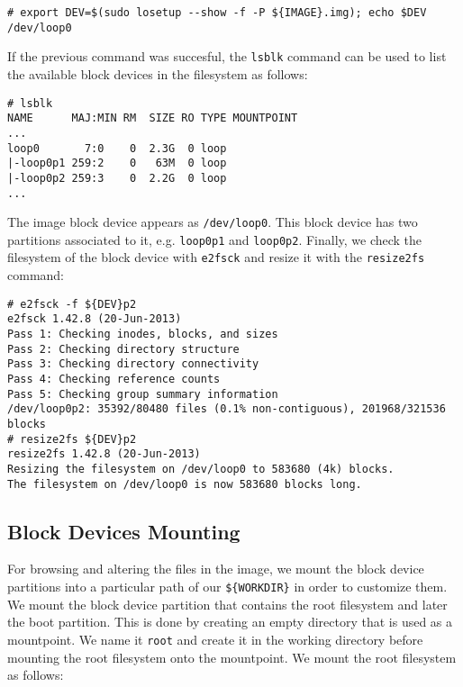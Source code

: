 \begin{lstlisting}[]
# export DEV=$(sudo losetup --show -f -P ${IMAGE}.img); echo $DEV
/dev/loop0
\end{lstlisting}
\FloatBarrier
\vspace{-5mm}

If the previous command was succesful, the \texttt{lsblk} command can be used
to list the available block devices in the filesystem as follows:

\begin{lstlisting}[]
# lsblk
NAME      MAJ:MIN RM  SIZE RO TYPE MOUNTPOINT
...
loop0       7:0    0  2.3G  0 loop
|-loop0p1 259:2    0   63M  0 loop
|-loop0p2 259:3    0  2.2G  0 loop
...
\end{lstlisting}
\FloatBarrier
\vspace{-5mm}

The image block device appears as \texttt{/dev/loop0}. This block device has
two partitions associated to it, e.g. \texttt{loop0p1} and \texttt{loop0p2}.
Finally, we check the filesystem of the block device with \texttt{e2fsck} and
resize it with the \texttt{resize2fs} command:%

\begin{lstlisting}[]
# e2fsck -f ${DEV}p2
e2fsck 1.42.8 (20-Jun-2013)
Pass 1: Checking inodes, blocks, and sizes
Pass 2: Checking directory structure
Pass 3: Checking directory connectivity
Pass 4: Checking reference counts
Pass 5: Checking group summary information
/dev/loop0p2: 35392/80480 files (0.1% non-contiguous), 201968/321536 blocks
# resize2fs ${DEV}p2
resize2fs 1.42.8 (20-Jun-2013)
Resizing the filesystem on /dev/loop0 to 583680 (4k) blocks.
The filesystem on /dev/loop0 is now 583680 blocks long.
\end{lstlisting}
\FloatBarrier

\subsection{Block Devices Mounting}
For browsing and altering the files in the image, we mount the block
device partitions into a particular path of our \texttt{\$\{WORKDIR\}} in order
to customize them. We mount the block device partition that
contains the root filesystem and later the boot partition. This is done by
creating an empty directory that is used as a mountpoint. We name it
\texttt{root} and create it in the working directory before mounting the
root filesystem onto the mountpoint. We mount the root filesystem
as follows:

